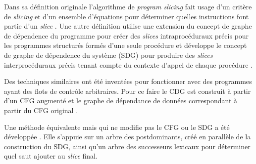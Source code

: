   \vspace{1em}


  Dans sa définition originale l'algorithme de \textit{program slicing} fait
  usage d'un critère de \textit{slicing} et d'un ensemble d'équations pour
  déterminer quelles instructions font partie d'un \textit{slice} \cite{Wei81}.
  Une autre définition utilise une extension du concept de graphe de dépendence
  du programme pour créer des \textit{slices} intraprocéduraux précis pour
  les programmes structurés formés d'une seule procédure et développe le concept
  de graphe de dépendence du système (SDG) pour produire des \textit{slices}
  interprocéduraux précis tenant compte du contexte d'appel de chaque procédure
  \cite{HRB90}.

  Des techniques similaires ont été inventées pour fonctionner avec des
  programmes ayant des flots de contrôle arbitraires. Pour ce faire le CDG est
  construit à partir d'un CFG augmenté et le graphe de dépendance de données
  correspondant à partir du CFG original \cite{BH93, CF94}.

  Une méthode équivalente mais qui ne modifie pas le CFG ou le SDG a été
  développée \cite{Agr94}. Elle s'appuie sur un arbre des postdominants, créé en
  parallèle de la construction du SDG, ainsi qu'un arbre des successeurs
  lexicaux pour déterminer quel saut ajouter au \textit{slice} final.
  

  
  \vspace{1em}



